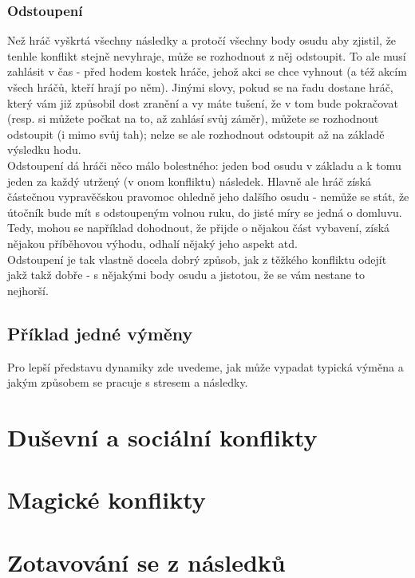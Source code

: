 \subsubsection{Odstoupení}
\label{sec:odstoupeni}

Než hráč vyškrtá všechny následky a protočí všechny body osudu aby zjistil, že tenhle konflikt stejně nevyhraje, může se rozhodnout z něj odstoupit. To ale musí zahlásit v čas - před hodem kostek hráče, jehož akci se chce vyhnout (a též akcím všech hráčů, kteří hrají po něm). Jinými slovy, pokud se na řadu dostane hráč, který vám již způsobil dost zranění a vy máte tušení, že v tom bude pokračovat (resp. si můžete počkat na to, až zahlásí svůj záměr), můžete se rozhodnout odstoupit (i mimo svůj tah); nelze se ale rozhodnout odstoupit až na základě výsledku hodu.\\
Odstoupení dá hráči něco málo bolestného: jeden bod osudu v základu a k tomu jeden za každý utržený (v onom konfliktu) následek. Hlavně ale hráč získá částečnou vypravěčskou pravomoc ohledně jeho dalšího osudu - nemůže se stát, že útočník bude mít s odstoupeným volnou ruku, do jisté míry se jedná o domluvu. Tedy, mohou se například dohodnout, že přijde o nějakou část vybavení, získá nějakou příběhovou výhodu, odhalí nějaký jeho aspekt atd. \\
Odstoupení je tak vlastně docela dobrý způsob, jak z těžkého konfliktu odejít jakž takž dobře - s nějakými body osudu a jistotou, že se vám nestane to nejhorší. 

\subsection{Příklad jedné výměny}
\label{sec:priklad-vymena}

Pro lepší představu dynamiky zde uvedeme, jak může vypadat typická výměna a jakým způsobem se pracuje s stresem a následky.

\section{Duševní a sociální konflikty}
\label{sec:dusevni-soc-konflikty}

\section{Magické konflikty}
\label{sec:magicke-konflikty}

\section{Zotavování se z následků}
\label{sec:zotavovanise}



